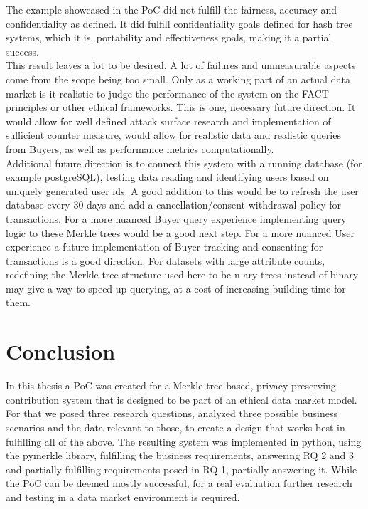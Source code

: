 \documentclass[a4paper,11pt]{report} %
\theoremstyle{change}
\theoremstyle{theoremstyle}
\begin{document}
\begin{itemize}
\end{itemize}
The example showcased in the PoC did not fulfill the fairness, accuracy and confidentiality as defined. It did fulfill confidentiality goals defined for hash tree systems, which it is, portability and effectiveness goals, making it a partial success.\\
This result leaves a lot to be desired. A lot of failures and unmeasurable aspects come from the scope being too small. Only as a working part of an actual data market is it realistic to judge the performance of the system on the FACT principles or other ethical frameworks. This is one, necessary future direction. It would allow for well defined attack surface research and implementation of sufficient counter measure, would allow for realistic data and realistic queries from Buyers, as well as performance metrics computationally.\\
Additional future direction is to connect this system with a running database (for example postgreSQL), testing data reading and identifying users based on uniquely generated user ids. A good addition to this would be to refresh the user database every 30 days and add a cancellation/consent withdrawal policy for transactions. For a more nuanced Buyer query experience implementing query logic to these Merkle trees would be a good next step. For a more nuanced User experience a future implementation of Buyer tracking and consenting for transactions is a good direction. For datasets with large attribute counts, redefining the Merkle tree structure used here to be n-ary trees instead of binary may give a way to speed up querying, at a cost of increasing building time for them.
\section{Conclusion}
In this thesis a PoC was created for a Merkle tree-based, privacy preserving contribution system that is designed to be part of an ethical data market model. For that we posed three research questions, analyzed three possible business scenarios and the data relevant to those, to create a design that works best in fulfilling all of the above. The resulting system was implemented in python, using the pymerkle library, fulfilling the business requirements, answering RQ 2 and 3 and partially fulfilling requirements posed in RQ 1, partially answering it. While the PoC can be deemed mostly successful, for a real evaluation further research and testing in a data market environment is required.
\end{document}
